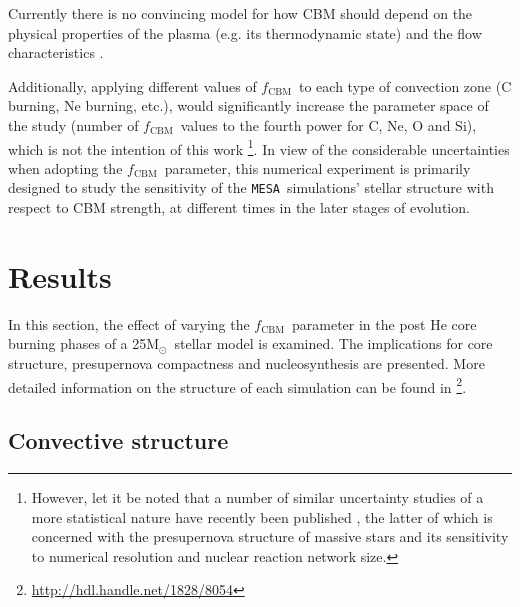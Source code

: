 \documentclass[useAMS,usenatbib]{mn2e}
\newcommand{\Msun}{\ensuremath{\mathrm{M}_\odot}}
\newcommand{\shortcomment}[3]{\textcolor{#1}{[#2: #3]}}
\newcommand{\fhcom}[1]{\shortcomment{Green}{FH}{#1}}
\newcommand{\adcom}[1]{\shortcomment{Mulberry}{AD}{#1}}
\newcommand{\fcbm}{\ensuremath{f_\mathrm{CBM}}}
\newcommand{\mesa}{\texttt{MESA}}
\begin{document}
Currently there is no convincing model for how CBM should depend on the
physical properties of the plasma (e.g. its thermodynamic state) and the flow
characteristics \citep[see][for the current status in CBM
modelling for stellar evolution]{Arnett2015,Viallet2015}.

Additionally, applying different values of \fcbm~to each type of convection 
zone (C burning, Ne burning, etc.), would significantly increase the 
parameter space of the study (number of \fcbm~values to the fourth 
power for C, Ne, O and Si), which is not the intention of this work
\footnote{However,
	let it be noted that a number of similar uncertainty studies of a more
	statistical nature have recently been published
	\citep{Farmer2015,Fields2016,Farmer2016}, the latter of which is
	concerned with the presupernova structure of massive stars and its
	sensitivity to numerical resolution and nuclear reaction network
size.}.  In view of the considerable uncertainties when adopting the
\fcbm~parameter, this numerical experiment is primarily designed to study the
sensitivity of the \mesa~simulations' stellar structure with respect to CBM
strength, at different times in the later stages of evolution.


\section{Results} \label{sec: results}

In this section, the effect of varying the \fcbm~parameter in the post He core
burning phases of a 25\Msun~stellar model is examined. The implications for
core structure, presupernova compactness and nucleosynthesis are presented. 
More detailed information on the structure of each simulation can be found in 
\citet{Davisthesis}\footnote{\url{http://hdl.handle.net/1828/8054}}.

\subsection{Convective structure} \label{sec: Convective structure}
\end{document}
